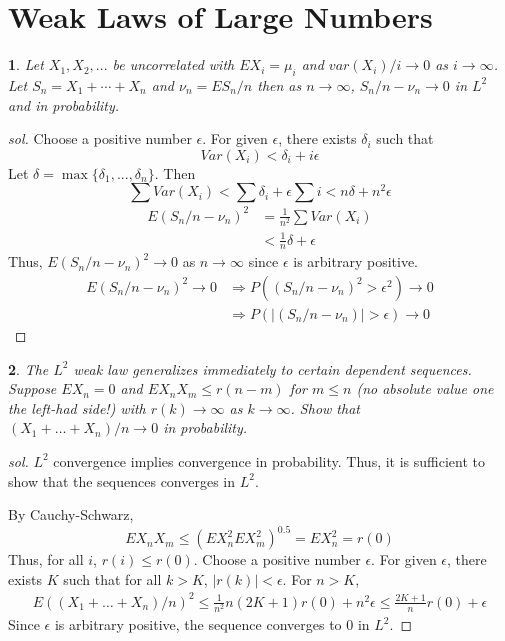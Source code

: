\documentclass{report}
\newtheorem{ex}{}[section]
\begin{document}
\section{Weak Laws of Large Numbers}
\begin{ex}
Let $X_1,X_2,...$ be uncorrelated with $EX_i = \mu_i$ and $var(X_i)/i \to 0$ as $i \to \infty$. Let $S_n = X_1+\dotsb +X_n$ and $\nu_n = ES_n /n$ then as $n\to\infty$, $S_n/n - \nu_n \to 0$ in $L^2$ and in probability.
\end{ex}
\begin{proof}[sol]
Choose a positive number $\epsilon$. For given $\epsilon$, there exists $\delta_i$ such that
\[Var(X_i) < \delta_i + i\epsilon\]
Let $\delta = \max\{\delta_1,...,\delta_n\}$. Then
\[\sum Var(X_i) < \sum\delta_i + \epsilon\sum i< n\delta + n^2\epsilon\]
\begin{align*}
    E(S_n / n - \nu_n)^2 &= \frac{1}{n^2}\sum Var(X_i)\\
    &< \frac{1}{n}\delta + \epsilon
\end{align*}
Thus, $E(S_n / n - \nu_n)^2 \to 0$ as $n \to \infty$ since $\epsilon$ is arbitrary positive.
\begin{align*}
    E(S_n / n - \nu_n)^2 \to 0 &\Rightarrow P((S_n / n - \nu_n)^2 > \epsilon^2 ) \to 0\\
    &\Rightarrow P(|(S_n / n - \nu_n)| > \epsilon) \to 0
\end{align*}
\end{proof}
\begin{ex}
The $L^2$ weak law generalizes immediately to certain dependent sequences. Suppose $EX_n = 0$ and $EX_nX_m \le r(n-m)$ for $m \le n$ (no absolute value one the left-had side!) with $r(k) \to \infty$ as $k \to \infty$. Show that $(X_1+\dotsc+X_n) / n \to 0$ in probability.
\end{ex}
\begin{proof}[sol]
$L^2$ convergence implies convergence in probability. Thus, it is sufficient to show that the sequences converges in $L^2$.

By Cauchy-Schwarz, 
\[EX_nX_m \le (EX_n^2EX_m^2)^{0.5} = EX_n^2 = r(0)\]
Thus, for all $i$, $r(i) \le r(0)$.
Choose a positive number $\epsilon$. For given $\epsilon$, there exists $K$ such that for all $k > K$, $|r(k)| < \epsilon$. For $n > K$,
\begin{align*}
    E((X_1+\dotsc+X_n) / n)^2 \le \frac{1}{n^2} n(2K+1)r(0) + n^2\epsilon  \le \frac{2K+1}{n}r(0) + \epsilon
\end{align*}
Since $\epsilon$ is arbitrary positive, the sequence converges to 0 in $L^2$.
\end{proof}
\end{document}
